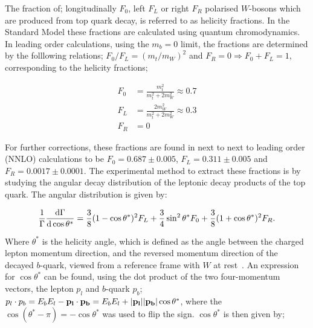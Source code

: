 \documentclass[12pt,a4paper]{article}
\numberwithin{equation}{section}
\begin{document}
The fraction of; longitudinally $F_0$, left $F_L$ or right $F_R$ polarised
$W$-bosons which are produced from top quark decay, is referred to as helicity
fractions. In the Standard Model these fractions are calculated using quantum
chromodynamics. In leading order calculations, using the $m_b = 0$ limit, the
fractions are determined by the folllowing relations; $F_0/F_L = (m_t/m_W)^2$
and $F_R = 0 \Rightarrow F_0 + F_L = 1$, corresponding to the helicity fractions;

\begin{align}
\label{eq:helfrac}
  F_0 &= \frac{m_t^2}{m_t^2 + 2 m_W^2} \approx 0.7\\
  F_L &= \frac{2 m_W^2}{m_t^2 + 2 m_W^2} \approx 0.3\\
  F_R &= 0
\end{align}

For further corrections, these fractions are found in next to next to leading
order (NNLO) calculations to be $F_0 = 0.687 \pm 0.005$, $F_L = 0.311 \pm 0.005$
and $F_R = 0.0017 \pm 0.0001$\cite{Czarnecki_2010}. The experimental method to
extract these fractions is by studying the angular decay distribution of the
leptonic decay products of the top quark. The angular distribution is given by:

\begin{equation}
  \frac{1}{\Gamma}\dv{\Gamma}{\cos \theta^*} = \frac{3}{8}(1-\cos \theta^*)^2 F_L +
  \frac{3}{4}\sin^2 \theta^* F_0 + \frac{3}{8}(1+\cos \theta^*)^2 F_R.
\end{equation}

Where $\theta^*$ is the helicity angle, which is defined as the angle between the
charged lepton momentum direction, and the reversed momentum direction of the
decayed $b$-quark, viewed from a reference frame with $W$ at
rest~\cite{PhysRevD.45.124}. An expression for $\cos \theta^*$ can be found, using
the dot product of the two four-momentum vectors, the lepton $p_l$ and $b$-quark
$p_b$; $p_l\cdot p_b=E_bE_l-\vb{p_l\cdot p_b}=E_bE_l+\abs{\vb{p_l}}\abs{\vb{p_b}}\cos \theta^*$,
where the $\cos{(\theta^{*}-\pi)}=-\cos \theta^{*}$ was used to flip the sign.
$\cos \theta^{*}$ is then given by;
\end{document}
